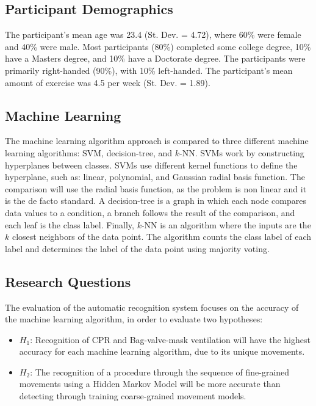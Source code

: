 \subsection{Participant Demographics}
\label{sec:Data-Collection:Participant-Demographics}
The participant’s mean age was 23.4 (St. Dev. = 4.72), where 60\% were female and 40\% were male. Most participants (80\%) completed some college degree, 10\% have a Masters degree, and 10\% have a Doctorate degree. The participants were primarily right-handed (90\%), with 10\% left-handed. The participant's mean amount of exercise was 4.5 per week (St. Dev. = 1.89).

\subsection{Machine Learning}
\label{sec:Data-Collection:Machine-Learning}
 The machine learning algorithm approach is compared to three different machine learning algorithms: SVM, decision-tree, and $k$-NN. SVMs work by constructing hyperplanes between classes. SVMs use different kernel functions to define the hyperplane, such as: linear, polynomial, and Gaussian radial basis function. The comparison will use the radial basis function, as the problem is non linear and it is the de facto standard. A decision-tree is a graph in which each node compares data values to a condition, a branch follows the result of the comparison, and each leaf is the class label. Finally, $k$-NN is an algorithm where the inputs are the $k$ closest neighbors of the data point. The algorithm counts the class label of each label and determines the label of the data point using majority voting. 
 
 \subsection{Research Questions}
 \label{sec:Data-Collection:Research-Questions}
 The evaluation of the automatic recognition system focuses on the accuracy of the machine learning algorithm, in order to evaluate two hypotheses:
 \begin{itemize}
 	\item $H_1$: Recognition of CPR and Bag-valve-mask ventilation will have the highest accuracy for each machine learning algorithm, due to its unique movements.
 	\item $H_2$: The recognition of a procedure through the sequence of fine-grained movements using a Hidden Markov Model will be more accurate than detecting through training coarse-grained movement models.
 \end{itemize}